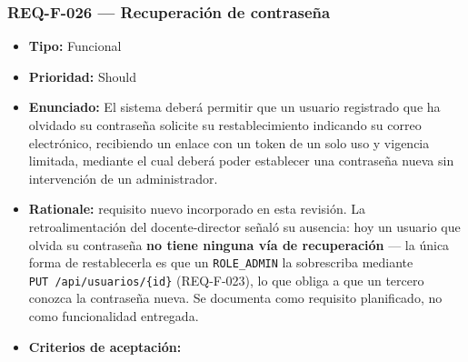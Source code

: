 \documentclass[
  spanish,
]{article}
\providecommand{\tightlist}{%
  \setlength{\itemsep}{0pt}\setlength{\parskip}{0pt}}
\begin{document}
\subsubsection{REQ-F-026 --- Recuperación de
contraseña}\label{req-f-026-recuperaciuxf3n-de-contraseuxf1a}

\begin{itemize}
\tightlist
\item
  \textbf{Tipo:} Funcional
\item
  \textbf{Prioridad:} Should
\item
  \textbf{Enunciado:} El sistema deberá permitir que un usuario
  registrado que ha olvidado su contraseña solicite su restablecimiento
  indicando su correo electrónico, recibiendo un enlace con un token de
  un solo uso y vigencia limitada, mediante el cual deberá poder
  establecer una contraseña nueva sin intervención de un administrador.
\item
  \textbf{Rationale:} requisito nuevo incorporado en esta revisión. La
  retroalimentación del docente-director señaló su ausencia: hoy un
  usuario que olvida su contraseña \textbf{no tiene ninguna vía de
  recuperación} --- la única forma de restablecerla es que un
  \texttt{ROLE\_\allowbreak{}ADMIN} la sobrescriba mediante
  \texttt{PUT\ /\allowbreak{}api/\allowbreak{}usuarios/\allowbreak{}\{id\}} (REQ-F-023), lo que obliga a que un
  tercero conozca la contraseña nueva. Se documenta como requisito
  planificado, no como funcionalidad entregada.
\item
  \textbf{Criterios de aceptación:}


\end{itemize}
\end{document}
